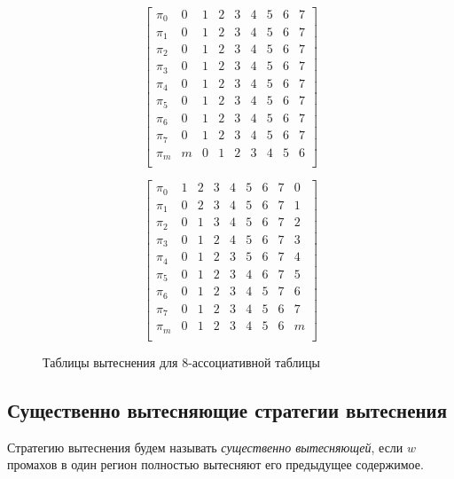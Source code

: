 \begin{figure}[h] \centering
\parbox{0.4\textwidth}{
$$ \left[
     \begin{array}{c|cccccccc}
       \pi_0 & 0 & 1 & 2 & 3 & 4 & 5 & 6 & 7 \\
       \pi_1 & 0 & 1 & 2 & 3 & 4 & 5 & 6 & 7 \\
       \pi_2 & 0 & 1 & 2 & 3 & 4 & 5 & 6 & 7 \\
       \pi_3 & 0 & 1 & 2 & 3 & 4 & 5 & 6 & 7 \\
       \pi_4 & 0 & 1 & 2 & 3 & 4 & 5 & 6 & 7 \\
       \pi_5 & 0 & 1 & 2 & 3 & 4 & 5 & 6 & 7 \\
       \pi_6 & 0 & 1 & 2 & 3 & 4 & 5 & 6 & 7 \\
       \pi_7 & 0 & 1 & 2 & 3 & 4 & 5 & 6 & 7 \\
       \pi_m & m & 0 & 1 & 2 & 3 & 4 & 5 & 6 \\
     \end{array}
   \right]$$
\center \FIFO} \qquad
\parbox{0.4\textwidth}{
$$ \left[
     \begin{array}{c|cccccccc}
       \pi_0 & 1 & 2 & 3 & 4 & 5 & 6 & 7 & 0 \\
       \pi_1 & 0 & 2 & 3 & 4 & 5 & 6 & 7 & 1 \\
       \pi_2 & 0 & 1 & 3 & 4 & 5 & 6 & 7 & 2 \\
       \pi_3 & 0 & 1 & 2 & 4 & 5 & 6 & 7 & 3 \\
       \pi_4 & 0 & 1 & 2 & 3 & 5 & 6 & 7 & 4 \\
       \pi_5 & 0 & 1 & 2 & 3 & 4 & 6 & 7 & 5 \\
       \pi_6 & 0 & 1 & 2 & 3 & 4 & 5 & 7 & 6 \\
       \pi_7 & 0 & 1 & 2 & 3 & 4 & 5 & 6 & 7 \\
       \pi_m & 0 & 1 & 2 & 3 & 4 & 5 & 6 & m \\
     \end{array}
   \right]$$
\center \MRU } \caption{Таблицы вытеснения для 8-ассоциативной
таблицы}\label{fig:fifo_mru_tables}
\end{figure}

\subsection{Существенно вытесняющие стратегии вытеснения}\label{sec:essentially_displacing}

Стратегию вытеснения будем называть \emph{существенно вытесняющей}, если $w$ промахов в один регион полностью вытесняют его предыдущее содержимое.

